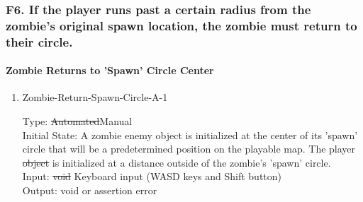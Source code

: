 \documentclass[12pt, titlepage]{article}
\DeclareRobustCommand{\hsout}[1]{\texorpdfstring{\sout{#1}}{#1}}
\newcounter{ftnum}
\begin{document}
\subsubsection{{\color{magenta} F6.} If the player runs past a certain radius from the zombie’s original spawn location, the zombie must return to their circle.} 

\paragraph{Zombie Returns to 'Spawn' Circle Center}

\begin{enumerate}

\item{Zombie-Return-Spawn-Circle-A-1\\}  \label{F6-1}

Type: \hsout{Automated}{\color{magenta}Manual}\\
					
Initial State: A zombie enemy object is initialized at the center of its 'spawn' circle that will be a predetermined position on the playable map. The player \hsout{object} is initialized at a distance outside of the zombie's 'spawn' circle.\\
					
Input: \hsout{void} {\color{magenta} Keyboard input (WASD keys and Shift button)} \\
					
Output: void or assertion error \\
					

\end{enumerate}
\end{document}
